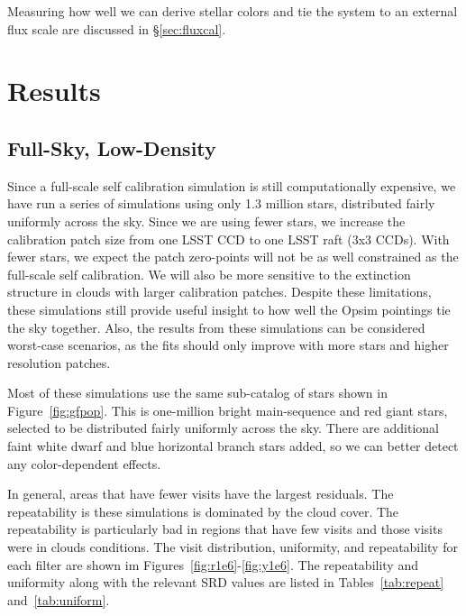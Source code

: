 \documentclass[12pt,preprint]{aastex}
\begin{document}
Measuring how well we can derive stellar colors and tie the system to an external flux scale are discussed in \S\ref{sec:fluxcal}.








\section{Results}



\subsection{Full-Sky, Low-Density}\label{sec:fsld}

Since a full-scale self calibration simulation is still computationally expensive, we have run a series of simulations using only 1.3 million stars, distributed fairly uniformly across the sky.  Since we are using fewer stars, we increase the calibration patch size from one LSST CCD to one LSST raft (3x3 CCDs).  With fewer stars, we expect the patch zero-points will not be as well constrained as the full-scale self calibration.  We will also be more sensitive to the extinction structure in clouds with larger calibration patches.  Despite these limitations, these simulations still provide useful insight to how well the Opsim pointings tie the sky together.  Also, the results from these simulations can be considered worst-case scenarios, as the fits should only improve with more stars and higher resolution patches.


Most of these simulations use the same sub-catalog of stars shown in Figure~\ref{fig:gfpop}.  This is one-million bright main-sequence and red giant stars, selected to be distributed fairly uniformly across the sky.  There are additional faint white dwarf and blue horizontal branch stars added, so we can better detect any color-dependent effects.

In general, areas that have fewer visits have the largest residuals.  The repeatability is these simulations is dominated by the cloud cover.  The repeatability is particularly bad in regions that have few visits and those visits were in clouds conditions.  The visit distribution, uniformity, and repeatability for each filter are shown im Figures~\ref{fig:r1e6}-\ref{fig:y1e6}.  The repeatability and uniformity along with the relevant SRD values are listed in Tables~\ref{tab:repeat} and~\ref{tab:uniform}.
\end{document}
